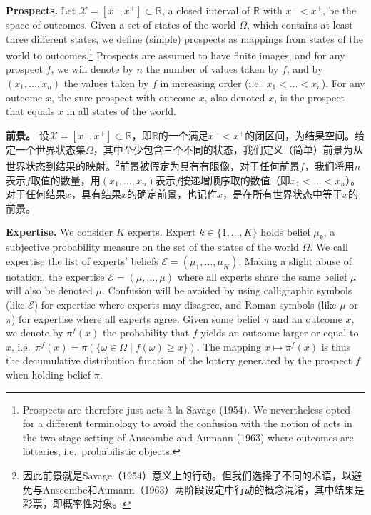 \documentclass[12pt,a4paper]{article}
\newenvironment{original}
  {\par\noindent\ignorespaces}
  {\par}
\newenvironment{translation}
  {\par\noindent{\color{transblue}\ignorespaces}}
  {\par\medskip}
\newcommand{\R}{\mathbb{R}}
\begin{document}
\begin{original}
\textbf{Prospects.} Let $\mathcal{X} = [x^{-}, x^{+}] \subset \R$, a closed interval of $\R$ with $x^{-} < x^{+}$, be the space of outcomes. Given a set of states of the world $\Omega$, which contains at least three different states, we define (simple) prospects as mappings from states of the world to outcomes.\footnote{Prospects are therefore just acts \`{a} la Savage (1954). We nevertheless opted for a different terminology to avoid the confusion with the notion of acts in the two-stage setting of Anscombe and Aumann (1963) where outcomes are lotteries, i.e.\ probabilistic objects.} Prospects are assumed to have finite images, and for any prospect $f$, we will denote by $n$ the number of values taken by $f$, and by $(x_{1}, \dots, x_{n})$ the values taken by $f$ in increasing order (i.e.\ $x_{1} < \dots < x_{n}$). For any outcome $x$, the sure prospect with outcome $x$, also denoted $x$, is the prospect that equals $x$ in all states of the world.
\end{original}

\begin{translation}
\textbf{前景。} 设$\mathcal{X} = [x^{-}, x^{+}] \subset \R$，即$\R$的一个满足$x^{-} < x^{+}$的闭区间，为结果空间。给定一个世界状态集$\Omega$，其中至少包含三个不同的状态，我们定义（简单）前景为从世界状态到结果的映射。\footnote{因此前景就是Savage（1954）意义上的行动。但我们选择了不同的术语，以避免与Anscombe和Aumann（1963）两阶段设定中行动的概念混淆，其中结果是彩票，即概率性对象。}前景被假定为具有有限像，对于任何前景$f$，我们将用$n$表示$f$取值的数量，用$(x_{1}, \dots, x_{n})$表示$f$按递增顺序取的数值（即$x_{1} < \dots < x_{n}$）。对于任何结果$x$，具有结果$x$的确定前景，也记作$x$，是在所有世界状态中等于$x$的前景。
\end{translation}

\begin{original}
\textbf{Expertise.} We consider $K$ experts. Expert $k \in \{1, \dots, K\}$ holds belief $\mu_{k}$, a subjective probability measure on the set of the states of the world $\Omega$. We call expertise the list of experts' beliefs $\mathcal{E} = (\mu_{1}, \dots, \mu_{K})$. Making a slight abuse of notation, the expertise $\mathcal{E} = (\mu, \dots, \mu)$ where all experts share the same belief $\mu$ will also be denoted $\mu$. Confusion will be avoided by using calligraphic symbols (like $\mathcal{E}$) for expertise where experts may disagree, and Roman symbols (like $\mu$ or $\pi$) for expertise where all experts agree. Given some belief $\pi$ and an outcome $x$, we denote by $\pi^{f}(x)$ the probability that $f$ yields an outcome larger or equal to $x$, i.e.\ $\pi^{f}(x) = \pi(\{\omega \in \Omega \mid f(\omega) \geq x\})$. The mapping $x \mapsto \pi^{f}(x)$ is thus the decumulative distribution function of the lottery generated by the prospect $f$ when holding belief $\pi$.
\end{original}
\end{document}

